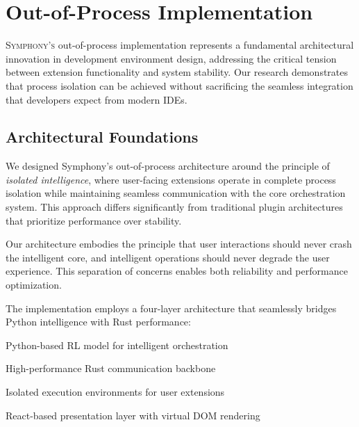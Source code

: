 
\section*{Out-of-Process Implementation}

\lettrine{S}{ymphony's} out-of-process implementation represents a fundamental architectural innovation in development environment design, addressing the critical tension between extension functionality and system stability. Our research demonstrates that process isolation can be achieved without sacrificing the seamless integration that developers expect from modern IDEs.

\subsection*{Architectural Foundations}

We designed Symphony's out-of-process architecture around the principle of \textit{isolated intelligence}, where user-facing extensions operate in complete process isolation while maintaining seamless communication with the core orchestration system. This approach differs significantly from traditional plugin architectures that prioritize performance over stability.

\begin{infobox}[title=Process Isolation Philosophy]
Our architecture embodies the principle that user interactions should never crash the intelligent core, and intelligent operations should never degrade the user experience. This separation of concerns enables both reliability and performance optimization.
\end{infobox}

The implementation employs a four-layer architecture that seamlessly bridges Python intelligence with Rust performance:

\begin{description}[leftmargin=4cm,labelwidth=3.5cm]
    \item[\textbf{Conductor Core}] Python-based RL model for intelligent orchestration
    \item[\textbf{IPC Bus}] High-performance Rust communication backbone
    \item[\textbf{Extension Processes}] Isolated execution environments for user extensions
    \item[\textbf{User Interface}] React-based presentation layer with virtual DOM rendering
\end{description}

